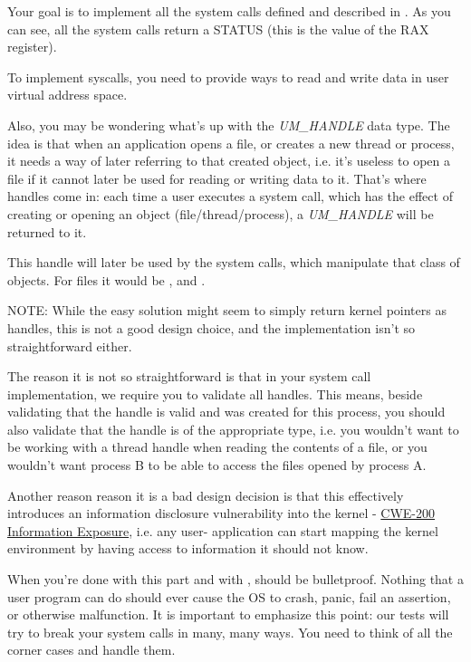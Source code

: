 Your goal is to implement all the system calls defined and described in . As
you can see, all the system calls return a STATUS (this is the value of the RAX register).

To implement syscalls, you need to provide ways to read and write data in user virtual
address space.

Also, you may be wondering what's up with the \textit{UM\_HANDLE} data type. The idea is that when
an application opens a file, or creates a new thread or process, it needs a way of later referring to
that created object, i.e. it's useless to open a file if it cannot later be used for reading or
writing data to it. That's where handles come in: each time a user executes a system call, which has
the effect of creating or opening an object (file/thread/process), a \textit{UM\_HANDLE} will be
returned to it.

This handle will later be used by the system calls, which manipulate that class of objects. For files
it would be ,  and .

NOTE: While the easy solution might seem to simply return kernel pointers as handles, this is
 not a good design choice, and the implementation isn't so straightforward either.

The reason it is not so straightforward is that in your system call implementation, we require you to
validate all handles. This means, beside validating that the handle is valid and was created for
this process, you should also validate that the handle is of the appropriate type, i.e. you wouldn't
want to be working with a thread handle when reading the contents of a file, or you wouldn't want
process B to be able to access the files opened by process A.

Another reason reason it is a bad design decision is that this effectively introduces an
information disclosure vulnerability into the kernel - 
\href{https://cwe.mitre.org/data/definitions/200.html}{CWE-200 Information Exposure}, i.e. any user-
application can start mapping the kernel environment by having access to information it should
not know.

When you're done with this part and with , \projectname should be
bulletproof. Nothing that a user program can do should ever cause the OS to crash, panic, fail an
assertion, or otherwise malfunction. It is important to emphasize this point: our tests will try to
break your system calls in many, many ways. You need to think of all the corner cases and handle
them.

